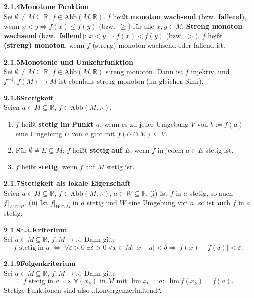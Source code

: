 \documentclass[a4paper,12pt]{article}
\newcommand{\gentry}[3]{%
  \noindent\textbf{#1\quad #2}\nopagebreak\\[0.2em]
  #3\par\smallskip
}
\begin{document}
\gentry{2.1.4}{Monotone Funktion}{%
  Sei $\emptyset \neq M \subseteq \mathbb{R}$, $f \in \mathrm{Abb}(M, \mathbb{R})$.
  $f$ heißt \textbf{monoton wachsend} (bzw.\ \textbf{fallend}), wenn
  $x < y \Rightarrow f(x) \leq f(y)$ (bzw.\ $\geq$) für alle $x, y \in M$.
  \textbf{Streng monoton wachsend} (bzw.\ \textbf{fallend}): $x < y \Rightarrow f(x) < f(y)$
  (bzw.\ $>$). $f$ heißt \textbf{(streng) monoton}, wenn $f$ (streng) monoton
  wachsend oder fallend ist.
}

\gentry{2.1.5}{Monotonie und Umkehrfunktion}{%
  Sei $\emptyset \neq M \subseteq \mathbb{R}$, $f \in \mathrm{Abb}(M, \mathbb{R})$
  streng monoton. Dann ist $f$ injektiv, und $f^{-1}: f(M) \to M$ ist ebenfalls
  streng monoton (im gleichen Sinn).
}

\gentry{2.1.6}{Stetigkeit}{%
  Seien $a \in M \subseteq \mathbb{R}$, $f \in \mathrm{Abb}(M, \mathbb{R})$.
  \begin{enumerate}[label=(\roman*),topsep=2pt,itemsep=1pt]
    \item $f$ heißt \textbf{stetig im Punkt $a$}, wenn es zu jeder Umgebung $V$
          von $b := f(a)$ eine Umgebung $U$ von $a$ gibt mit $f(U \cap M) \subseteq V$.
    \item Für $\emptyset \neq E \subseteq M$: $f$ heißt \textbf{stetig auf $E$},
          wenn $f$ in jedem $a \in E$ stetig ist.
    \item $f$ heißt \textbf{stetig}, wenn $f$ auf $M$ stetig ist.
  \end{enumerate}
}

\gentry{2.1.7}{Stetigkeit als lokale Eigenschaft}{%
  Seien $a \in M \subseteq \mathbb{R}$, $f \in \mathrm{Abb}(M, \mathbb{R})$, $a \in W \subseteq \mathbb{R}$.
  (i) Ist $f$ in $a$ stetig, so auch $f|_{W \cap M}$.
  (ii) Ist $f|_{W \cap M}$ in $a$ stetig und $W$ eine Umgebung von $a$, so ist
  auch $f$ in $a$ stetig.
}

\gentry{2.1.8}{$\varepsilon$-$\delta$-Kriterium}{%
  Sei $a \in M \subseteq \mathbb{R}$, $f: M \to \mathbb{R}$. Dann gilt:
  \[
    f \text{ stetig in } a \;\Longleftrightarrow\;
    \forall \varepsilon > 0\;\exists \delta > 0\;\forall x \in M:
    |x - a| < \delta \Rightarrow |f(x) - f(a)| < \varepsilon.
  \]
}

\gentry{2.1.9}{Folgenkriterium}{%
  Sei $a \in M \subseteq \mathbb{R}$, $f: M \to \mathbb{R}$. Dann gilt:
  \[
    f \text{ stetig in } a \;\Longleftrightarrow\;
    \forall (x_k) \text{ in } M \text{ mit } \lim x_k = a:\; \lim f(x_k) = f(a).
  \]
  Stetige Funktionen sind also ,,konvergenzerhaltend``.
}
\end{document}
